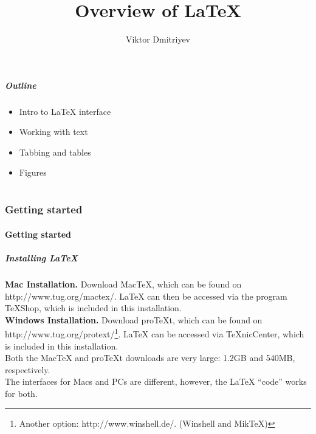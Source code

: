 \documentclass[slidestop,compress,mathserif]{beamer}
\title{Overview of LaTeX}
\subtitle{}
\author{Viktor Dmitriyev}
\institute{Adapter from Mini Course on LaTeX by \href{https://github.com/OpenIntroOrg/mini-course-materials}{David Diez}}
\date{}
\begin{document}
\newenvironment{act}[1]{{\color{command}#1}}{}


\frame{ \titlepage }

\begin{frame}
  \frametitle{Outline}
  \begin{itemize}
  \item Intro to LaTeX interface
  \item Working with text
  \item Tabbing and tables
  \item Figures
  \end{itemize}
\end{frame}

\part{}

\section[Getting started]{Getting started}

\subsection[Getting started]{Getting started}

\begin{frame} \frametitle{Installing LaTeX}
{\bf Mac Installation. } Download MacTeX, which can be found on {\color{highlight}http://www.tug.org/mactex/}. LaTeX can then be accessed via the program TeXShop, which is included in this installation. \\
\vspace{0.5cm}
{\bf Windows Installation. } Download proTeXt, which can be found on {\color{highlight}http://www.tug.org/protext/}\footnote{Another option: {\color{highlight}http://www.winshell.de/}. (Winshell and MikTeX)}. LaTeX can be accessed via TeXnicCenter, which is included in this installation. \\
\vspace{0.5cm}
Both the MacTeX and proTeXt downloads are very large: 1.2GB and 540MB, respectively. \\
\vspace{0.5cm}
The interfaces for Macs and PCs are different, however, the LaTeX ``code'' works for both.
\end{frame}
\end{document}
